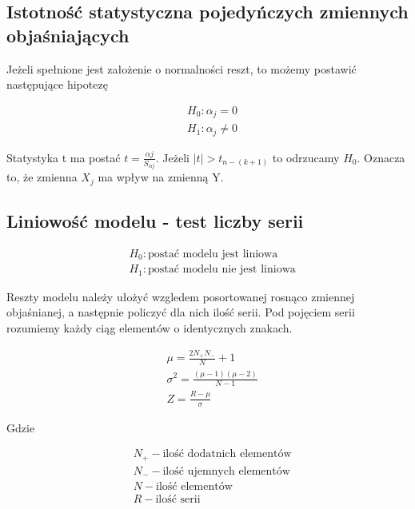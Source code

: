 \subsection{Istotność statystyczna pojedyńczych zmiennych objaśniających}\label{subsec:istotność-statystyczna-zmiennych-objaśniających}
Jeżeli spełnione jest założenie o normalności reszt, to możemy postawić następujące hipotezę

\begin{equation}
    \begin{split}
        &H_0: \alpha_j = 0 \\
        &H_1: \alpha_j \ne 0
    \end{split}
\end{equation}

Statystyka t ma postać \(t = \frac{\alpha j}{S_{\alpha j}}\).
Jeżeli \(|t| > t_{n -(k+1)}\) to odrzucamy \(H_0\).
Oznacza to, że zmienna \(X_{j}\) ma wpływ na zmienną Y.

\subsection{Liniowość modelu - test liczby serii}\label{subsec:liniowość-modelu---test-liczby-serii}

\begin{equation}
    \begin{split}
        &H_0: \text{postać modelu jest liniowa} \\
        &H_1: \text{postać modelu nie jest liniowa}
    \end{split}
\end{equation}

Reszty modelu należy ułożyć wzgledem posortowanej rosnąco zmiennej objaśnianej, a następnie policzyć dla nich ilość serii.
Pod pojęciem serii rozumiemy każdy ciąg elementów o identycznych znakach.

\begin{equation}
    \begin{split}
        &\mu = \frac{2N_+ N_-}{N} +1 \\
        &\sigma^2 = \frac{(\mu -1)(\mu-2)}{N-1} \\
        &Z = \frac{R - \mu}{\sigma}
    \end{split}
\end{equation}


Gdzie

\begin{equation}
    \begin{split}
        &N_+ - \text{ilość dodatnich elementów} \\
        &N_- - \text{ilość ujemnych elementów} \\
        &N - \text{ilość elementów} \\
        &R - \text{ilość serii} \\
    \end{split}
\end{equation}


